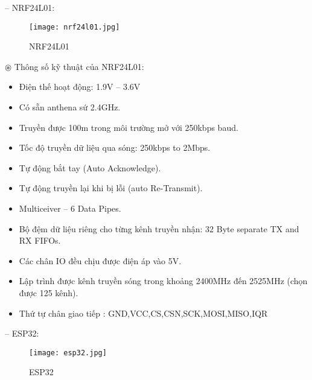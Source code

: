 -- NRF24L01:
\begin{figure}[H]
	\centering
	\texttt{[image: nrf24l01.jpg]}
	\caption{NRF24L01}
\end{figure}

$\circledast$ Thông số kỹ thuật của NRF24L01:
\begin{itemize}
	\item Điện thế hoạt động: 1.9V – 3.6V
	\item Có sẵn anthena sứ 2.4GHz.
	\item Truyền được 100m trong môi trường mở với 250kbps baud.
	\item Tốc độ truyền dữ liệu qua sóng: 250kbps to 2Mbps.
	\item Tự động bắt tay (Auto Acknowledge).
	\item Tự động truyền lại khi bị lỗi (auto Re-Transmit).
	\item Multiceiver – 6 Data Pipes.
	\item Bộ đệm dữ liệu riêng cho từng kênh truyền nhận: 32 Byte separate TX and RX FIFOs.
	\item Các chân IO đều chịu được điện áp vào 5V.
	\item Lập trình được kênh truyền sóng trong khoảng 2400MHz đến 2525MHz (chọn được 125 kênh).
	\item Thứ tự chân giao tiếp : GND,VCC,CS,CSN,SCK,MOSI,MISO,IQR
\end{itemize}

-- ESP32:
\begin{figure}[H]
	\centering
	\texttt{[image: esp32.jpg]}
	\caption{ESP32}
\end{figure}

